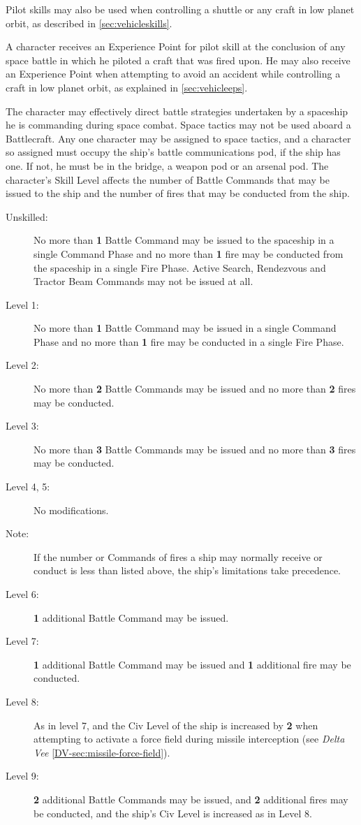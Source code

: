 Pilot skills may also be used when controlling a shuttle or any craft
in low planet orbit, as described in \ref{sec:vehicleskills}.

A character receives an Experience Point for pilot skill at the
conclusion of any space battle in which he piloted a craft that was
fired upon.  He may also receive an Experience Point when attempting to
avoid an accident while controlling a craft in low planet orbit, as
explained in \ref{sec:vehicleeps}.

\label{sec:skill-space-tactics}

The character may effectively direct battle strategies undertaken by a
spaceship he is commanding during space combat.  Space tactics may not
be used aboard a Battlecraft.  Any one character may be assigned to
space tactics, and a character so assigned must occupy the ship's
battle communications pod, if the ship has one.  If not, he must be in
the bridge, a weapon pod or an arsenal pod.  The character's Skill
Level affects the number of Battle Commands that may be issued to the
ship and the number of fires that may be conducted from the ship.

\begin{description}
\item[Unskilled:] No more than \textbf{1} Battle Command may be issued
  to the spaceship in a single Command Phase and no more than
  \textbf{1} fire may be conducted from the spaceship in a single Fire
  Phase.  Active Search, Rendezvous and Tractor Beam Commands may not
  be issued at all.
\item[Level 1:] No more than \textbf{1} Battle Command may be issued
  in a single Command Phase and no more than \textbf{1} fire may be
  conducted in a single Fire Phase.
\item[Level 2:] No more than \textbf{2} Battle Commands may be issued
  and no more than \textbf{2} fires may be conducted.
\item[Level 3:] No more than \textbf{3} Battle Commands may be issued
  and no more than \textbf{3} fires may be conducted.
\item[Level 4, 5:] No modifications.
\item[Note:] If the number or Commands of fires a ship may normally
  receive or conduct is less than listed above, the ship's limitations
  take precedence.
\item[Level 6:] \textbf{1} additional Battle Command may be issued.
\item[Level 7:] \textbf{1} additional Battle Command may be issued and
  \textbf{1} additional fire may be conducted.
\item[Level 8:] As in level 7, and the Civ Level of the ship is
  increased by \textbf{2} when attempting to activate a force field
  during missile interception (see \emph{Delta Vee}
  \ref{DV-sec:missile-force-field}).
\item[Level 9:] \textbf{2} additional Battle Commands may be issued,
  and \textbf{2} additional fires may be conducted, and the ship's
  Civ Level is increased as in Level 8.
\end{description}

